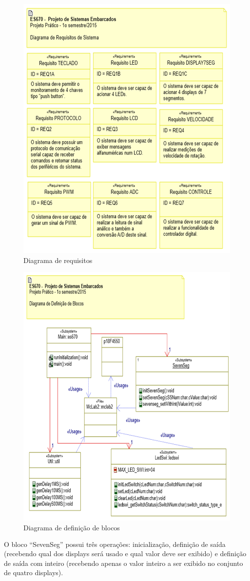 \documentclass{article}
\begin{document}
\begin{figure}[H]
	\centering
	\includegraphics[width=0.9\linewidth]{requisitos}
	\caption{Diagrama de requisitos}
	\label{fig:requisitos}
\end{figure}
\begin{figure}[H]
	\centering
	\includegraphics[width=0.9\linewidth]{blocos}
	\caption{Diagrama de definição de blocos}
	\label{fig:blocos}
\end{figure}
O bloco ``SevenSeg'' possui três operações: inicialização, definição de saída (recebendo qual dos displays será usado e qual valor deve ser exibido) e definição de saída com inteiro (recebendo apenas o valor inteiro a ser exibido no conjunto de quatro displays).
\end{document}

